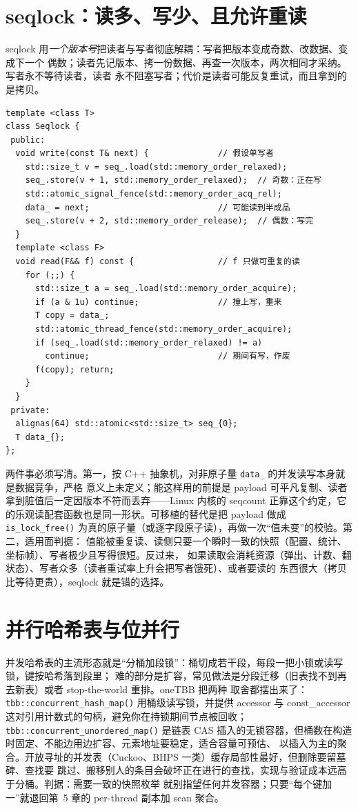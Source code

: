 \documentclass[12pt,a4paper,fontset=fandol]{ctexbook}
\newcommand{\Fn}[1]{\texttt{#1()}}
\newcommand{\Tp}[1]{\texttt{#1}}
\begin{document}
\section{seqlock：读多、写少、且允许重读}

seqlock 用\emph{一个版本号}把读者与写者彻底解耦：写者把版本变成奇数、改数据、变成下一个
偶数；读者先记版本、拷一份数据、再查一次版本，两次相同才采纳。写者永不等待读者，读者
永不阻塞写者；代价是读者可能反复重试，而且拿到的是拷贝。
\begin{lstlisting}[style=cppstyle,caption={seqlock 的读写两侧：关键是版本号，不是锁}]
template <class T>
class Seqlock {
 public:
  void write(const T& next) {              // 假设单写者
    std::size_t v = seq_.load(std::memory_order_relaxed);
    seq_.store(v + 1, std::memory_order_relaxed);  // 奇数：正在写
    std::atomic_signal_fence(std::memory_order_acq_rel);
    data_ = next;                          // 可能读到半成品
    seq_.store(v + 2, std::memory_order_release);  // 偶数：写完
  }
  template <class F>
  void read(F&& f) const {                 // f 只做可重复的读
    for (;;) {
      std::size_t a = seq_.load(std::memory_order_acquire);
      if (a & 1u) continue;                // 撞上写，重来
      T copy = data_;
      std::atomic_thread_fence(std::memory_order_acquire);
      if (seq_.load(std::memory_order_relaxed) != a)
        continue;                          // 期间有写，作废
      f(copy); return;
    }
  }
 private:
  alignas(64) std::atomic<std::size_t> seq_{0};
  T data_{};
};
\end{lstlisting}

两件事必须写清。第一，按 C++ 抽象机，对非原子量 \Tp{data\_} 的并发读写本身就是数据竞争，严格
意义上未定义；能这样用的前提是 payload 可平凡复制、读者拿到脏值后一定因版本不符而丢弃——Linux
内核的 seqcount 正靠这个约定，它的乐观读配套函数也是同一形状。可移植的替代是把 payload 做成
\Fn{is\_lock\_free} 为真的原子量（或逐字段原子读），再做一次``值未变''的校验。第二，适用面判据：
值能被重复读、读侧只要一个瞬时一致的快照（配置、统计、坐标帧）、写者极少且写得很短。反过来，
如果读取会消耗资源（弹出、计数、翻状态）、写者众多（读者重试率上升会把写者饿死）、或者要读的
东西很大（拷贝比等待更贵），seqlock 就是错的选择。

\section{并行哈希表与位并行}

并发哈希表的主流形态就是``分桶加段锁''：桶切成若干段，每段一把小锁或读写锁，键按哈希落到段里；
难的部分是扩容，常见做法是分段迁移（旧表找不到再去新表）或者 stop-the-world 重排。oneTBB 把两种
取舍都摆出来了：\Fn{tbb::concurrent\_hash\_map} 用桶级读写锁，并提供 accessor 与 const\_accessor
这对引用计数式的句柄，避免你在持锁期间节点被回收；\Fn{tbb::concurrent\_unordered\_map} 是链表
CAS 插入的无锁容器，但桶数在构造时固定、不能边用边扩容、元素地址要稳定，适合容量可预估、
以插入为主的聚合。开放寻址的并发表（Cuckoo、BHPS 一类）缓存局部性最好，但删除要留墓碑、查找要
跳过、搬移别人的条目会破坏正在进行的查找，实现与验证成本远高于分桶。判据：需要一致的快照枚举
就别指望任何并发容器；只要``每个键加一''就退回第~5 章的 per-thread 副本加 scan 聚合。
\end{document}
